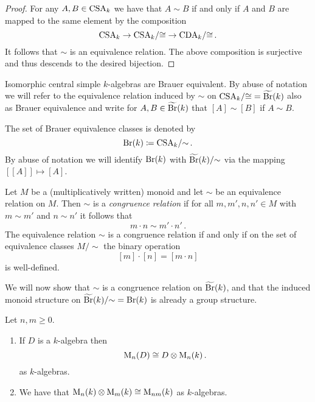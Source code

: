 \begin{proof}
  For any $A, B \in \operatorname{CSA}_k$ we have that $A \sim B$ if and only if $A$ and $B$ are mapped to the same element by the composition
  \[
        \operatorname{CSA}_k
    \to \operatorname{CSA}_k\!/{\cong}
    \to \operatorname{CDA}_k\!/{\cong} \,.
  \]
  It follows that $\sim$ is an equivalence relation.
  The above composition is surjective and thus descends to the desired bijection.
\end{proof}


\begin{remark}
  Isomorphic central simple $k$-algebras are Brauer equivalent.
  By abuse of notation we will refer to the equivalence relation induced by $\sim$ on $\operatorname{CSA}_k\!/{\cong} = \widetilde{\operatorname{Br}}(k)$ also as Brauer equivalence and write for $A, B \in \widetilde{\operatorname{Br}}(k)$ that $[A] \sim [B]$ if $A \sim B$.
\end{remark}


\begin{notation}
  The set of Brauer equivalence classes is denoted by
  \[
              \operatorname{Br}(k)
    \coloneqq  \operatorname{CSA}_k\!/{\sim} \,.
  \]
  By abuse of notation we will identify $\operatorname{Br}(k)$ with $\widetilde{\operatorname{Br}}(k)/{\sim}$ via the mapping $[[A]] \mapsto [A]$.
\end{notation}


\begin{recall}
  Let $M$ be a (multiplicatively written) monoid and let $\sim$ be an equivalence relation on $M$.
  Then $\sim$ is a \emph{congruence relation} if for all $m, m', n, n' \in M$ with $m \sim m'$ and $n \sim n'$ it follows that
  \[
    m \cdot n \sim m' \cdot n' \,.
  \]
  The equivalence relation $\sim$ is a congruence relation if and only if on the set of equivalence classes $M/{\sim}$ the binary operation
  \[
      [m] \cdot [n]
    = [m \cdot n]
  \]
  is well-defined.
\end{recall}


\begin{fluff}
  We will now show that $\sim$ is a congruence relation on $\widetilde{\operatorname{Br}}(k)$, and that the induced monoid structure on $\widetilde{\operatorname{Br}}(k)/{\sim} = \operatorname{Br}(k)$ is already a group structure.
\end{fluff}


\begin{lemma}
  Let $n, m \geq 0$.
  \begin{enumerate}
    \item
      If $D$ is a $k$-algebra then
      \[
              \operatorname{M}_n(D)
        \cong D \otimes \operatorname{M}_n(k) \,.
      \]
      as $k$-algebras.
    \item
      We have that $\operatorname{M}_n(k) \otimes \operatorname{M}_m(k) \cong \operatorname{M}_{nm}(k)$ as $k$-algebras.
  \end{enumerate}
\end{lemma}


